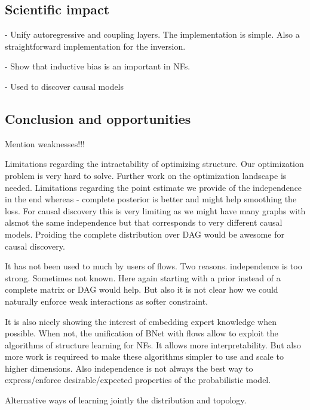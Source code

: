 \subsection{Scientific impact}

- Unify autoregressive and coupling layers. The implementation is simple. Also a straightforward implementation for the inversion.

- Show that inductive bias is an important in NFs.

- Used to discover causal models

\subsection{Conclusion and opportunities}
Mention weaknesses!!!

Limitations regarding the intractability of optimizing structure. Our optimization problem is very hard to solve. Further work on the optimization landscape is needed. Limitations regarding the point estimate we provide of the independence in the end whereas - complete posterior is better and might help smoothing the loss. For causal discovery this is very limiting as we might have many graphs with alsmot the same independence but that corresponds to very different causal models. Proiding the complete distribution over DAG would be awesome for causal discovery.

It has not been used to much by users of flows. Two reasons. independence is too strong. Sometimes not known. Here again starting with a prior instead of a complete matrix or DAG would help. But also it is not clear how we could naturally enforce weak interactions as softer constraint.

It is also nicely showing the interest of embedding expert knowledge when possible. When not, the unification of BNet with flows allow to exploit the algorithms of structure learning for NFs. It allows more interpretability.
But also more work is requireed to make these algorithms simpler to use and scale to higher dimensions. Also independence is not always the best way to express/enforce desirable/expected properties of the probabilistic model.

Alternative ways of learning jointly the distribution and topology.

